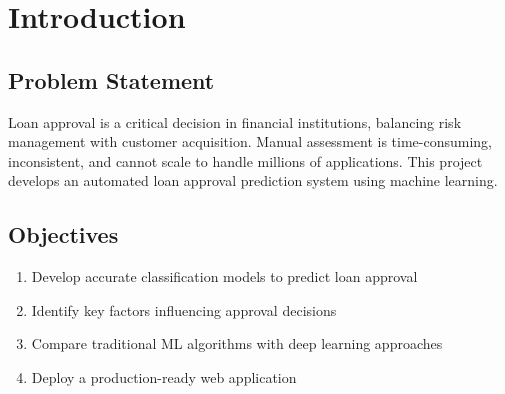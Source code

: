 \documentclass[12pt,a4paper]{article}
\begin{document}
\tableofcontents
\newpage

\begin{abstract}
This report presents a comprehensive machine learning approach to predict loan approval decisions. Using a dataset of 50,000 loan applications with 20 features, we develop and evaluate multiple classification models. Our analysis begins with Logistic Regression as a principled baseline, achieving 86.42\% accuracy and 0.944 ROC-AUC. Error analysis revealed that feature interactions (credit score $\times$ DTI) explain 40\% of classification errors, motivating the use of XGBoost. The final XGBoost model achieves \textbf{92.86\% accuracy} and \textbf{0.984 ROC-AUC}, a +7.45\% improvement by capturing non-linear interactions. The model is deployed as a production Streamlit application. Key findings reveal that product type and loan intent are stronger predictors than traditional credit metrics, with Credit Card products showing 33x higher approval odds compared to baseline.
\end{abstract}

\newpage

\section{Introduction}

\subsection{Problem Statement}

Loan approval is a critical decision in financial institutions, balancing risk management with customer acquisition. Manual assessment is time-consuming, inconsistent, and cannot scale to handle millions of applications. This project develops an automated loan approval prediction system using machine learning.

\subsection{Objectives}

\begin{enumerate}
    \item Develop accurate classification models to predict loan approval
    \item Identify key factors influencing approval decisions
    \item Compare traditional ML algorithms with deep learning approaches
    \item Deploy a production-ready web application
\end{enumerate}
\end{document}
